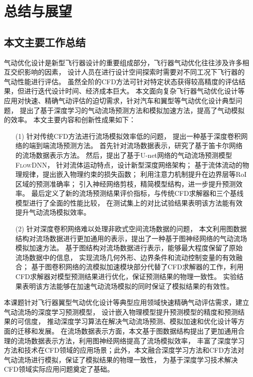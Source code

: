 \chapter{总结与展望}


\section{本文主要工作总结}

气动优化设计是新型飞行器设计的重要组成部分，飞行器气动优化往往涉及许多相互交织影响的因素，
设计人员在进行设计空间探索时需要对不同工况下飞行器的气动性能进行评估。
虽然全阶的CFD方法可针对特定状态获得较高精度的评估结果，但进行迭代设计时间、经济成本巨大。
本文面向复杂飞行器气动优化设计等应用对快速、精确气动评估的迫切需求，针对汽车和翼型等气动优化设计典型问题，
提出了基于深度学习的气动流场预测方法和模拟加速方法，提高了气动模拟的效率。
本文主要内容和创新性成果如下：

\begin{itemize}
	\item[(1)] 针对传统CFD方法进行流场模拟效率低的问题，
	提出一种基于深度卷积网络的端到端流场预测方法。
	首先针对流场数据表示，研究了基于笛卡尔网络的流场数据表示方法。
	然后，提出了基于U-net网络的气动流场预测模型\textsc{FlowDNN}，
	针对流体运动特点，设计新型深度网络架构；
	基于流体流动的物理规律，提出嵌入物理约束的损失函数；
	利用注意力机制提升在边界层等RoI区域的预测准确率；
	引入神经网络剪枝，精简模型结构，进一步提升预测效率。
	最后定义了新的流场预测结果评价指标，与传统CFD求解器和三个基线模型进行了全面的性能比较，
	在测试集上的对比试验结果表明该方法能有效提升气动流场模拟效率。
	
	\item[(2)] 针对深度卷积网络难以处理非欧式空间流场数据的问题，
	本文利用图数据结构对流场数据进行更加通用的表示，提出了一种基于图神经网络的气动流场模拟加速方法。
	基于图结构对流场数据进行表示，能够最大程度保留了原始流场数据中的信息，
	实现流场几何外形、边界条件和流动控制变量的有效融合；
	基于图卷积网络的流模拟加速模块部分代替了CFD求解器的工作，利用CFD求解器对模型预测结果进行优化，保证预测结果的物理一致性。
	实验结果表明该方法能够在加速气动流场模拟的同时保证了模拟结果的有效性。
	
\end{itemize}

本课题针对飞行器翼型气动优化设计等典型应用领域快速精确气动评估需求，建立气动流场的深度学习预测模型，
设计嵌入物理模型提升预测模型的精度和预测结果的可信度，
推动深度学习算法在解决气动流场预测、模拟加速和优化设计等方面的迁移和发展。
在流场数据表示方面，本文基于图数据结构提出了更加通用合理的流场数据表示方法，利用图神经网络提高了流场模拟效率，
丰富了深度学习方法和技术在CFD领域的应用场景；此外，本文融合深度学习方法和CFD方法对气动流场进行模拟，保证了模拟结果的物理一致性，
为基于深度学习技术解决CFD领域实际应用问题奠定了基础。

